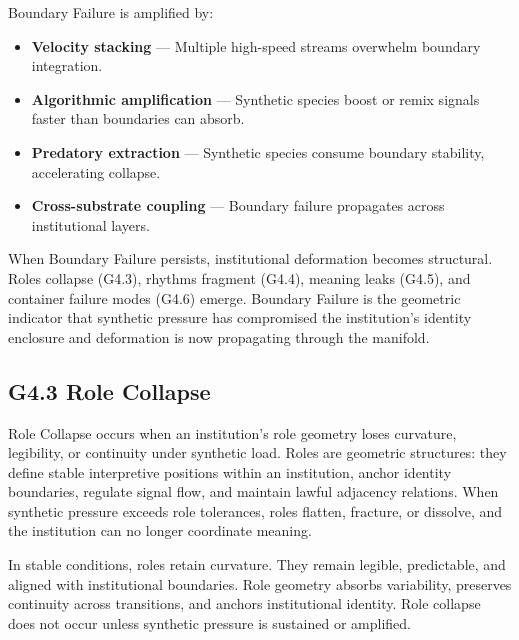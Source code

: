 \noindent Boundary Failure is amplified by:

\begin{itemize}[leftmargin=1.2cm]
    \item \textbf{Velocity stacking} — Multiple high-speed streams overwhelm
    boundary integration.

    \item \textbf{Algorithmic amplification} — Synthetic species boost or remix
    signals faster than boundaries can absorb.

    \item \textbf{Predatory extraction} — Synthetic species consume boundary
    stability, accelerating collapse.

    \item \textbf{Cross-substrate coupling} — Boundary failure propagates across
    institutional layers.
\end{itemize}

\medskip

\noindent When Boundary Failure persists, institutional deformation becomes
structural. Roles collapse (G4.3), rhythms fragment (G4.4), meaning leaks (G4.5),
and container failure modes (G4.6) emerge. Boundary Failure is the geometric
indicator that synthetic pressure has compromised the institution’s identity
enclosure and deformation is now propagating through the manifold.

\subsection*{G4.3 Role Collapse}

\noindent Role Collapse occurs when an institution’s role geometry loses
curvature, legibility, or continuity under synthetic load. Roles are geometric
structures: they define stable interpretive positions within an institution,
anchor identity boundaries, regulate signal flow, and maintain lawful adjacency
relations. When synthetic pressure exceeds role tolerances, roles flatten,
fracture, or dissolve, and the institution can no longer coordinate meaning.

\medskip

\noindent In stable conditions, roles retain curvature. They remain legible,
predictable, and aligned with institutional boundaries. Role geometry absorbs
variability, preserves continuity across transitions, and anchors institutional
identity. Role collapse does not occur unless synthetic pressure is sustained or
amplified.

